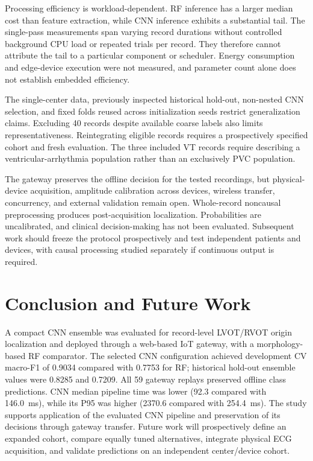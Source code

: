 \documentclass[conference,a4paper]{IEEEtran}
\begin{document}
Processing efficiency is workload-dependent. RF inference has a larger median cost than feature extraction, while CNN inference exhibits a substantial tail. The single-pass measurements span varying record durations without controlled background CPU load or repeated trials per record. They therefore cannot attribute the tail to a particular component or scheduler. Energy consumption and edge-device execution were not measured, and parameter count alone does not establish embedded efficiency.

The single-center data, previously inspected historical hold-out, non-nested CNN selection, and fixed folds reused across initialization seeds restrict generalization claims. Excluding 40 records despite available coarse labels also limits representativeness. Reintegrating eligible records requires a prospectively specified cohort and fresh evaluation. The three included VT records require describing a ventricular-arrhythmia population rather than an exclusively PVC population.

The gateway preserves the offline decision for the tested recordings, but physical-device acquisition, amplitude calibration across devices, wireless transfer, concurrency, and external validation remain open. Whole-record noncausal preprocessing produces post-acquisition localization. Probabilities are uncalibrated, and clinical decision-making has not been evaluated. Subsequent work should freeze the protocol prospectively and test independent patients and devices, with causal processing studied separately if continuous output is required.

\balance
\section{Conclusion and Future Work}
A compact CNN ensemble was evaluated for record-level LVOT/RVOT origin localization and deployed through a web-based IoT gateway, with a morphology-based RF comparator. The selected CNN configuration achieved development CV macro-F1 of 0.9034 compared with 0.7753 for RF; historical hold-out ensemble values were 0.8285 and 0.7209. All 59 gateway replays preserved offline class predictions. CNN median pipeline time was lower (92.3 compared with 146.0~ms), while its P95 was higher (2370.6 compared with 254.4~ms). The study supports application of the evaluated CNN pipeline and preservation of its decisions through gateway transfer. Future work will prospectively define an expanded cohort, compare equally tuned alternatives, integrate physical ECG acquisition, and validate predictions on an independent center/device cohort.
\end{document}
